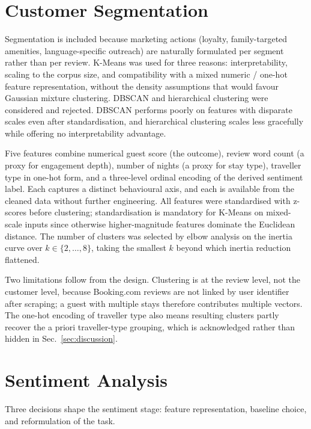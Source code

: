 \documentclass[runningheads]{llncs}
\begin{document}
\section{Customer Segmentation}
\label{sec:segmentation}

Segmentation is included because marketing actions (loyalty,
family-targeted amenities, language-specific outreach) are naturally
formulated per segment rather than per review. K-Means was used for three
reasons: interpretability, scaling to the corpus size, and compatibility
with a mixed numeric / one-hot feature representation, without the
density assumptions that would favour Gaussian mixture clustering. DBSCAN
and hierarchical clustering were considered and rejected. DBSCAN performs
poorly on features with disparate scales even after standardisation, and
hierarchical clustering scales less gracefully while offering no
interpretability advantage.

Five features combine numerical guest score (the outcome), review word
count (a proxy for engagement depth), number of nights (a proxy for stay
type), traveller type in one-hot form, and a three-level ordinal encoding
of the derived sentiment label. Each captures a distinct behavioural
axis, and each is available from the cleaned data without further
engineering. All features were standardised with z-scores before
clustering; standardisation is mandatory for K-Means on mixed-scale inputs
since otherwise higher-magnitude features dominate the Euclidean
distance. The number of clusters was selected by elbow analysis on the
inertia curve over $k \in \{2,\ldots,8\}$, taking the smallest $k$ beyond
which inertia reduction flattened.

Two limitations follow from the design. Clustering is at the review
level, not the customer level, because Booking.com reviews are not linked
by user identifier after scraping; a guest with multiple stays therefore
contributes multiple vectors. The one-hot encoding of traveller type also
means resulting clusters partly recover the a priori traveller-type
grouping, which is acknowledged rather than hidden in
Sec.~\ref{sec:discussion}.

\section{Sentiment Analysis}
\label{sec:sentiment}

Three decisions shape the sentiment stage: feature representation, baseline choice, and reformulation of the task.
\end{document}
